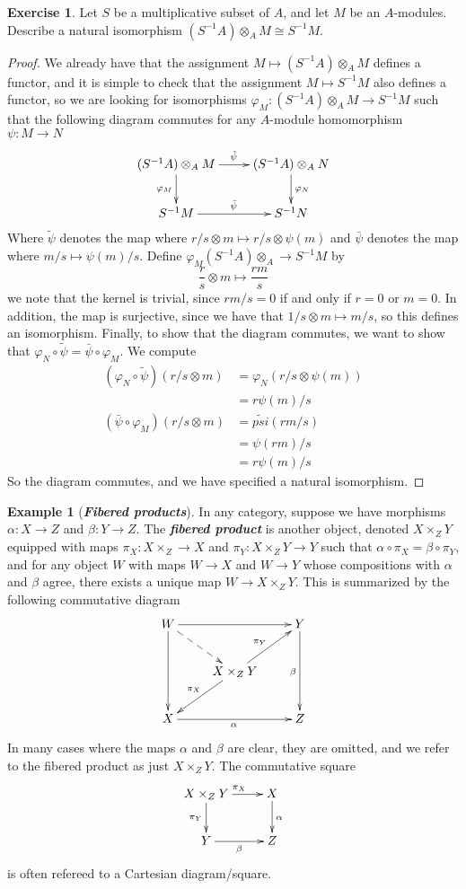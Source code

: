 \documentclass[psamsfonts]{amsart}
\theoremstyle{definition}
\newtheorem{exmp}[thm]{Example}
\newtheorem{exer}[thm]{Exercise}
\theoremstyle{remark}
\newcommand{\ib}[1]{\textbf{\textit{#1}}}
\newcommand{\inv}{^{-1}}
\begin{document}
%
\begin{exer}
Let $S$ be a multiplicative subset of $A$, and let $M$ be an $A$-modules. Describe a natural isomorphism $(S\inv A) \otimes_A M \cong S\inv M$.
\end{exer}
%
\begin{proof}
We already have that the assignment $M \mapsto (S\inv A) \otimes_A M$ defines a functor, and it is simple to check that the assignment $M \mapsto S\inv M$ also defines a functor, so we are looking for isomorphisms $\varphi_M : (S\inv A)\otimes_A M \to S\inv M$ such that the following diagram commutes for any $A$-module homomorphism $\psi : M \to  N$
$$\xymatrix{
(S\inv A) \otimes_A M \ar[d]_{\varphi_M }\ar[r]^{\tilde{\psi}} & (S\inv A) \otimes_A  N \ar[d]^{\varphi_N} \\
S\inv M \ar[r]^{\bar{\psi}} & S\inv N
}$$
Where $\tilde{\psi}$ denotes the map where $r/s \otimes m \mapsto r/s \otimes \psi(m)$ and $\bar{\psi}$ denotes the map where $m/s \mapsto \psi(m)/s$. Define $\varphi_M (S\inv A) \otimes_A \to S\inv M$ by
$$\frac{r}{s} \otimes m \mapsto \frac{rm}{s} $$
we note that the kernel is trivial, since $rm/s = 0$ if and only if $r = 0$ or $m = 0$. In addition, the map is surjective, since we have that $1/s \otimes m \mapsto m/s$, so this defines an isomorphism. Finally, to show that the diagram commutes, we want to show that $\varphi_N \circ \tilde{\psi} = \bar{\psi} \circ \varphi_M$. We compute
\begin{align*}
(\varphi_N \circ \tilde{\psi})(r/s \otimes m) &= \varphi_N(r/s \otimes \psi(m)) \\
&= r\psi(m)/s \\
(\bar{\psi} \circ \varphi_M)(r/s \otimes m) &= \tilde{psi}(rm/s) \\
&=  \psi(rm) /s \\
&= r\psi(m)/s
\end{align*}
So the diagram commutes, and we have specified a natural isomorphism.
\end{proof}
%
\begin{exmp}[\ib{Fibered products}]
In any category, suppose we have morphisms $\alpha : X \to Z$ and $\beta : Y \to Z$. The \ib{fibered product} is another object, denoted $X \times_Z Y$ equipped with maps $\pi_X : X \times_Z \to X$ and $\pi_Y: X \times_Z Y \to Y$ such that $\alpha \circ \pi_X = \beta \circ \pi_Y$, and for any object $W$ with maps $W \to X$ and $W \to Y$ whose compositions with $\alpha$ and $\beta$ agree, there exists a unique map $W \to X \times_Z Y$. This is summarized by the following commutative diagram
$$\xymatrix{
W \ar[rr]\ar[dd] \ar@{-->}[dr] & &Y \ar[dd]_{\beta}\\
& X \times_Z Y \ar[dl]_{\pi_X} \ar[ur]^{\pi_Y} \\
X \ar[rr]_{\alpha} & & Z
}$$
In many cases where the maps $\alpha$ and $\beta$ are clear, they are omitted, and we refer to the fibered product as just $X \times_Z Y$. The commutative square
$$\xymatrix{
X \times_Z Y \ar[d]_{\pi_Y} \ar[r]^{\pi_X} & X \ar[d]^\alpha \\
Y \ar[r]_\beta & Z
}$$
is often refereed to a Cartesian diagram/square.
\end{exmp}
\end{document}
